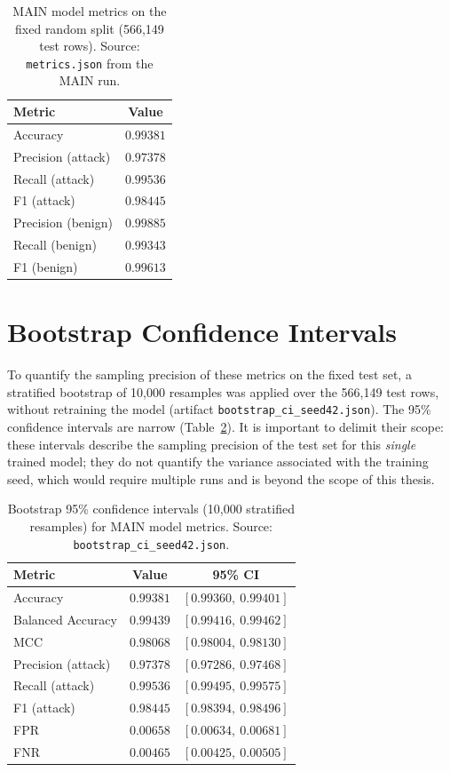 \begin{table}[htbp]
\centering
\begin{tabular}{lc}
\toprule
Metric & Value \\
\midrule
Accuracy & $0.99381$ \\
Precision (attack) & $0.97378$ \\
Recall (attack) & $0.99536$ \\
F1 (attack) & $0.98445$ \\
Precision (benign) & $0.99885$ \\
Recall (benign) & $0.99343$ \\
F1 (benign) & $0.99613$ \\
\bottomrule
\end{tabular}
\caption{MAIN model metrics on the fixed random split (566,149 test rows). Source: \texttt{metrics.json} from the MAIN run.}
\label{tab:main-metrics}
\end{table}

\section{Bootstrap Confidence Intervals}
To quantify the sampling precision of these metrics on the fixed test set, a stratified bootstrap of 10,000 resamples was applied over the 566,149 test rows, without retraining the model (artifact \texttt{bootstrap\_ci\_seed42.json}). The 95\% confidence intervals are narrow (Table~\ref{tab:bootstrap-ci}). It is important to delimit their scope: these intervals describe the sampling precision of the test set for this \emph{single} trained model; they do not quantify the variance associated with the training seed, which would require multiple runs and is beyond the scope of this thesis.

\begin{table}[htbp]
\centering
\begin{tabular}{lcc}
\toprule
Metric & Value & 95\% CI \\
\midrule
Accuracy & $0.99381$ & $[0.99360,\ 0.99401]$ \\
Balanced Accuracy & $0.99439$ & $[0.99416,\ 0.99462]$ \\
MCC & $0.98068$ & $[0.98004,\ 0.98130]$ \\
Precision (attack) & $0.97378$ & $[0.97286,\ 0.97468]$ \\
Recall (attack) & $0.99536$ & $[0.99495,\ 0.99575]$ \\
F1 (attack) & $0.98445$ & $[0.98394,\ 0.98496]$ \\
FPR & $0.00658$ & $[0.00634,\ 0.00681]$ \\
FNR & $0.00465$ & $[0.00425,\ 0.00505]$ \\
\bottomrule
\end{tabular}
\caption{Bootstrap 95\% confidence intervals (10,000 stratified resamples) for MAIN model metrics. Source: \texttt{bootstrap\_ci\_seed42.json}.}
\label{tab:bootstrap-ci}
\end{table}

